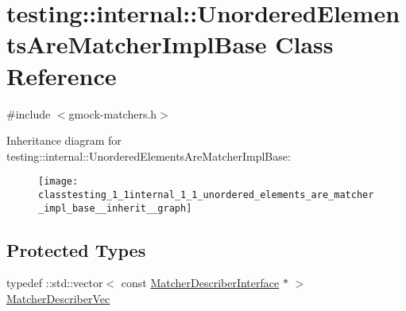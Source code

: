 \hypertarget{classtesting_1_1internal_1_1_unordered_elements_are_matcher_impl_base}{}\section{testing\+:\+:internal\+:\+:Unordered\+Elements\+Are\+Matcher\+Impl\+Base Class Reference}
\label{classtesting_1_1internal_1_1_unordered_elements_are_matcher_impl_base}


{\ttfamily \#include $<$gmock-\/matchers.\+h$>$}



Inheritance diagram for testing\+:\+:internal\+:\+:Unordered\+Elements\+Are\+Matcher\+Impl\+Base\+:
\nopagebreak
\begin{figure}[H]
\begin{center}
\leavevmode
\texttt{[image: classtesting\_1\_1internal\_1\_1\_unordered\_elements\_are\_matcher\_impl\_base\_\_inherit\_\_graph]}
\end{center}
\end{figure}
\subsection*{Protected Types}
\begin{DoxyCompactItemize}
\item 
typedef \+::std\+::vector$<$ const \hyperlink{classtesting_1_1_matcher_describer_interface}{Matcher\+Describer\+Interface} $\ast$ $>$ \hyperlink{classtesting_1_1internal_1_1_unordered_elements_are_matcher_impl_base_a81ca7ce793d4b25ce2a7d3e28b48cd64}{Matcher\+Describer\+Vec}
\end{DoxyCompactItemize}
